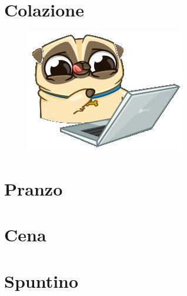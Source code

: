 
\chapter{Colazione}
\begin{figure}
\centering
  \includegraphics[width=.3\textwidth]{fig/carlino.png}
\caption{}
\label{}
\end{figure}
\chapter{Pranzo}

\chapter{Cena}

\chapter{Spuntino}

\pagebreak
